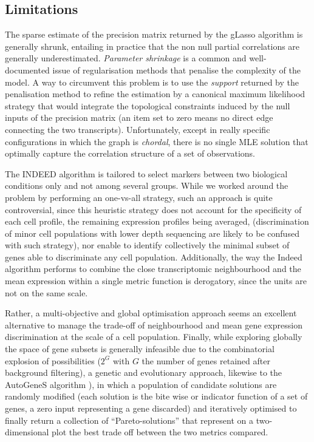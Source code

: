 \documentclass[long, final]{jobim}
\begin{document}
\subsection{Limitations}
\label{subsec:limitations}

The sparse estimate of the precision matrix returned by the gLasso \cite{mazumder_hastie11} algorithm is generally shrunk, entailing in practice that the non null partial correlations are generally underestimated. \textit{Parameter shrinkage} is a common and well-documented issue of regularisation methods that penalise the complexity of the model. A way to circumvent this problem is to use the \textit{support} returned by the penalisation method to refine the estimation by a canonical maximum likelihood strategy that would integrate the topological constraints induced by the null inputs of the precision matrix (an item set to zero means no direct edge connecting the two transcripts). Unfortunately, except in really specific configurations in which the graph is \textit{chordal}, there is no single MLE solution that optimally capture the correlation structure of a set of observations. 



The INDEED algorithm \cite{zuo_etal16} is tailored to select markers between two biological conditions only and not among several groups. While we worked around the problem by performing an one-vs-all strategy, such an approach is quite controversial, since this heuristic strategy does not account for the specificity of each cell profile, the remaining expression profiles being averaged, (discrimination of minor cell populations with lower depth sequencing are likely to be confused with such strategy), nor enable to identify collectively the minimal subset of genes able to discriminate any cell population. Additionally, the way the Indeed algorithm performs to combine the close transcriptomic neighbourhood and the mean expression within a single metric function is derogatory, since the units are not on the same scale. 

Rather, a multi-objective and global optimisation approach seems an excellent alternative to manage the trade-off of neighbourhood and mean gene expression discrimination at the scale of a cell population. Finally, while exploring globally the space of gene subsets is generally infeasible due to the combinatorial explosion of possibilities ($2^G$ with $G$ the number of genes retained after background filtering), a genetic and evolutionary approach, likewise to the AutoGeneS algorithm \cite{aliee_theis21}), in which a population of candidate solutions are randomly modified (each solution is the bite wise or indicator function of a set of genes, a zero input representing a gene discarded) and iteratively optimised to finally return a collection of \enquote{Pareto-solutions} that represent on a two-dimensional plot the best trade off between the two metrics compared. 
\end{document}
